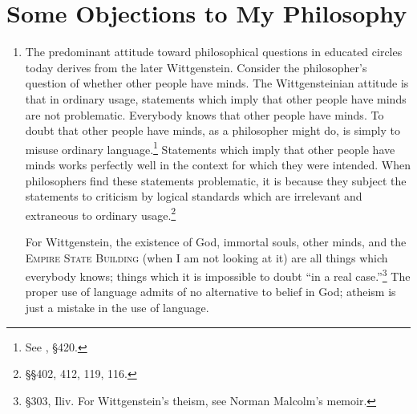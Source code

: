 \chapter{Some Objections to My Philosophy}


\begin{enumerate}[label=\textbf{\Alph*.}, wide, nosep, itemsep=1em]
\item The predominant attitude toward philosophical questions in 
educated circles today derives from the later Wittgenstein. Consider the 
philosopher's question of whether other people have minds. The 
Wittgensteinian attitude is that in ordinary usage, statements which imply 
that other people have minds are not problematic. Everybody knows that 
other people have minds. To doubt that other people have minds, as a 
philosopher might do, is simply to misuse ordinary language.\footnote{See 
, \S 420.} Statements which imply that other 
people have minds works perfectly well in the context for which they were 
intended. When philosophers find these statements problematic, it is because 
they subject the statements to criticism by logical standards which are 
irrelevant and extraneous to ordinary usage.\footnote{\S \S 402, 412, 119, 116.}

For Wittgenstein, the existence of God, immortal souls, other minds, 
and the \textsc{Empire State Building} (when I am not looking at it) are all things 
which everybody knows; things which it is impossible to doubt \enquote{in a real 
case.}\footnote{\S 303, Iliv. For Wittgenstein's theism, see Norman Malcolm's 
memoir.} The proper use of language admits of no alternative to belief in 
God; atheism is just a mistake in the use of language. 


\end{enumerate}

